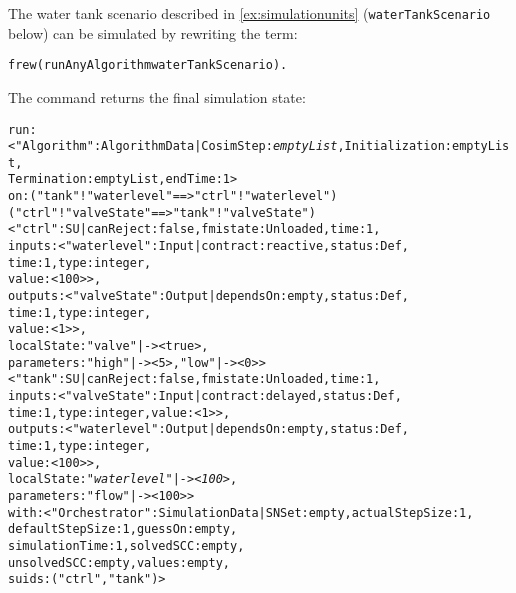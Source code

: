 \begin{example}\label{ex:algoexecution}
The water tank scenario described in \cref{ex:simulationunits} (\texttt{waterTankScenario} below) can be simulated by rewriting the term:
\small
\begin{alltt}
  frew (runAnyAlgorithm waterTankScenario).
\end{alltt}
\normalsize
The command returns the final simulation state:
\scriptsize
\begin{alltt}
run: < "Algorithm" : AlgorithmData | CosimStep : \emph{emptyList}, Initialization : emptyList,
                                     Termination : emptyList, endTime : 1 > 
on: ("tank" ! "waterlevel" ==> "ctrl" ! "waterlevel") 
    ("ctrl" ! "valveState" ==> "tank" ! "valveState")
    < "ctrl" : SU | canReject : false, fmistate : Unloaded, time : 1,
                    inputs : < "waterlevel" : Input | contract : reactive, status : Def, 
                                                      time : 1, type : integer, 
                                                      value : < 100 > >,
                    outputs : < "valveState" : Output | dependsOn : empty, status : Def, 
                                                        time : 1, type : integer, 
                                                        value : < 1 > >,
                    localState : "valve" |-> < true >,    
                    parameters :"high" |-> < 5 >, "low" |-> < 0 >  > 
    < "tank" : SU | canReject : false, fmistate : Unloaded, time : 1,
                    inputs : < "valveState" : Input | contract : delayed, status : Def,
                                                      time : 1, type : integer, value : < 1 > >,
                    outputs : < "waterlevel" : Output | dependsOn : empty, status : Def,
                                                        time : 1, type : integer, 
                                                        value : < 100 > >,
                    localState : \emph{"waterlevel" |-> < 100 >},
                    parameters : "flow" |-> < 100 > > 
with: < "Orchestrator" : SimulationData | SNSet : empty,       actualStepSize : 1, 
                                          defaultStepSize : 1, guessOn : empty,
                                          simulationTime : 1,  solvedSCC : empty, 
                                          unsolvedSCC : empty, values : empty,
                                          suids :("ctrl", "tank") >
\end{alltt}
\normalsize

\end{example}


